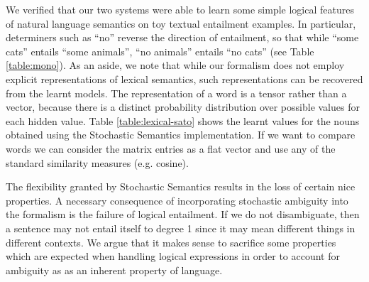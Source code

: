 \documentclass[manuscript]{clv2}
\begin{document}
We verified that our two systems were able to learn some simple
logical features of natural language semantics on toy textual
entailment examples. In particular, determiners such as ``no''
reverse the direction of entailment, so that while ``some cats''
entails ``some animals'', ``no animals'' entails ``no cats'' (see Table
\ref{table:mono}). As an aside, we note that while our formalism does not employ explicit representations of lexical semantics, such representations can be recovered from the learnt models. The representation of a word is a tensor rather than a vector, because there is a distinct probability distribution over possible values for each hidden value. Table \ref{table:lexical-sato} shows the learnt values for the nouns obtained using the Stochastic Semantics implementation. 
If we want to compare words 
we can consider the matrix entries as a
flat vector and use any of the standard similarity measures (e.g. 
cosine).



The flexibility granted by Stochastic Semantics results in the loss of certain nice properties. 
%
%
%
A necessary consequence of incorporating stochastic ambiguity into the formalism is the failure of logical entailment.
If we do not disambiguate, then a sentence may not entail itself to degree 1 since it may mean different things in different contexts. We argue that it makes sense to sacrifice some properties which are expected when handling logical expressions in order to account for ambiguity as as an inherent property of language.
\end{document}
